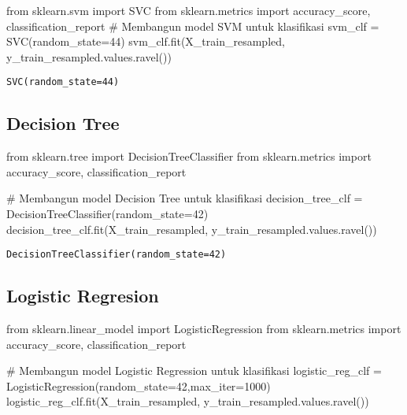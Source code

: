 \documentclass[
  letterpaper,
]{krantz}
\makeatletter
\newenvironment{Shaded}{\begin{snugshade}}{\end{snugshade}}
\newcommand{\CommentTok}[1]{\textcolor[rgb]{0.37,0.37,0.37}{#1}}
\newcommand{\DecValTok}[1]{\textcolor[rgb]{0.68,0.00,0.00}{#1}}
\newcommand{\ImportTok}[1]{\textcolor[rgb]{0.00,0.46,0.62}{#1}}
\newcommand{\NormalTok}[1]{\textcolor[rgb]{0.00,0.23,0.31}{#1}}
\newcommand{\OperatorTok}[1]{\textcolor[rgb]{0.37,0.37,0.37}{#1}}
\newenvironment{kframe}{%
\medskip{}
\setlength{\fboxsep}{.8em}
 \def\at@end@of@kframe{}%
 \ifinner\ifhmode%
  \def\at@end@of@kframe{\end{minipage}}%
  \begin{minipage}{\columnwidth}%
 \fi\fi%
 \def\FrameCommand##1{\hskip\@totalleftmargin \hskip-\fboxsep
 \colorbox{shadecolor}{##1}\hskip-\fboxsep
     \hskip-\linewidth \hskip-\@totalleftmargin \hskip\columnwidth}%
 \MakeFramed {\advance\hsize-\width
   \@totalleftmargin\z@ \linewidth\hsize
   \@setminipage}}%
 {\par\unskip\endMakeFramed%
 \at@end@of@kframe}
\renewenvironment{Shaded}{\begin{kframe}}{\end{kframe}}
\makeatother
\begin{document}
\begin{Shaded}
\begin{Highlighting}[]
\ImportTok{from}\NormalTok{ sklearn.svm }\ImportTok{import}\NormalTok{ SVC}
\ImportTok{from}\NormalTok{ sklearn.metrics }\ImportTok{import}\NormalTok{ accuracy\_score, classification\_report}
\CommentTok{\# Membangun model SVM untuk klasifikasi}
\NormalTok{svm\_clf }\OperatorTok{=}\NormalTok{ SVC(random\_state}\OperatorTok{=}\DecValTok{44}\NormalTok{)}
\NormalTok{svm\_clf.fit(X\_train\_resampled, y\_train\_resampled.values.ravel())}
\end{Highlighting}
\end{Shaded}

\begin{verbatim}
SVC(random_state=44)
\end{verbatim}

\hypertarget{decision-tree}{%
\subsection{Decision Tree}\label{decision-tree}}

\begin{Shaded}
\begin{Highlighting}[]
\ImportTok{from}\NormalTok{ sklearn.tree }\ImportTok{import}\NormalTok{ DecisionTreeClassifier}
\ImportTok{from}\NormalTok{ sklearn.metrics }\ImportTok{import}\NormalTok{ accuracy\_score, classification\_report}

\CommentTok{\# Membangun model Decision Tree untuk klasifikasi}
\NormalTok{decision\_tree\_clf }\OperatorTok{=}\NormalTok{ DecisionTreeClassifier(random\_state}\OperatorTok{=}\DecValTok{42}\NormalTok{)}
\NormalTok{decision\_tree\_clf.fit(X\_train\_resampled, y\_train\_resampled.values.ravel())}
\end{Highlighting}
\end{Shaded}

\begin{verbatim}
DecisionTreeClassifier(random_state=42)
\end{verbatim}

\hypertarget{logistic-regresion}{%
\subsection{Logistic Regresion}\label{logistic-regresion}}

\begin{Shaded}
\begin{Highlighting}[]
\ImportTok{from}\NormalTok{ sklearn.linear\_model }\ImportTok{import}\NormalTok{ LogisticRegression}
\ImportTok{from}\NormalTok{ sklearn.metrics }\ImportTok{import}\NormalTok{ accuracy\_score, classification\_report}

\CommentTok{\# Membangun model Logistic Regression untuk klasifikasi}
\NormalTok{logistic\_reg\_clf }\OperatorTok{=}\NormalTok{ LogisticRegression(random\_state}\OperatorTok{=}\DecValTok{42}\NormalTok{,max\_iter}\OperatorTok{=}\DecValTok{1000}\NormalTok{)}
\NormalTok{logistic\_reg\_clf.fit(X\_train\_resampled, y\_train\_resampled.values.ravel())}
\end{Highlighting}
\end{Shaded}
\end{document}
